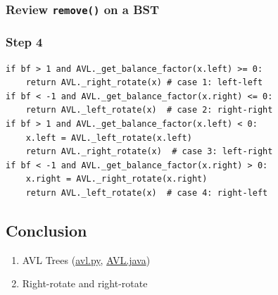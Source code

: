 \documentclass[aspectratio=169, 14pt]{beamer}
\begin{document}
\begin{frame}
	\frametitle{Review \texttt{remove()} on a BST}
\end{frame}

\begin{frame}[fragile]
	\frametitle{Step 4}
	\begin{verbatim}
if bf > 1 and AVL._get_balance_factor(x.left) >= 0:
    return AVL._right_rotate(x) # case 1: left-left
if bf < -1 and AVL._get_balance_factor(x.right) <= 0:
    return AVL._left_rotate(x)  # case 2: right-right
if bf > 1 and AVL._get_balance_factor(x.left) < 0:
    x.left = AVL._left_rotate(x.left)
    return AVL._right_rotate(x)  # case 3: left-right
if bf < -1 and AVL._get_balance_factor(x.right) > 0:
    x.right = AVL._right_rotate(x.right)
    return AVL._left_rotate(x)  # case 4: right-left
    \end{verbatim}

\end{frame}


\begin{frame}

	\section{\textcolor{darkmidnightblue}{Conclusion}}

	\begin{enumerate}
		\item AVL Trees (\href{https://github.com/ChenZhongPu/data-structure-swufe/blob/master/code/python/tree/avl.py}{avl.py}, \href{https://github.com/ChenZhongPu/data-structure-swufe/blob/master/code/java/tree/src/main/java/org/swufe/AVL.java}{AVL.java})
		\item Right-rotate and right-rotate
	\end{enumerate}
\end{frame}
\end{document}
